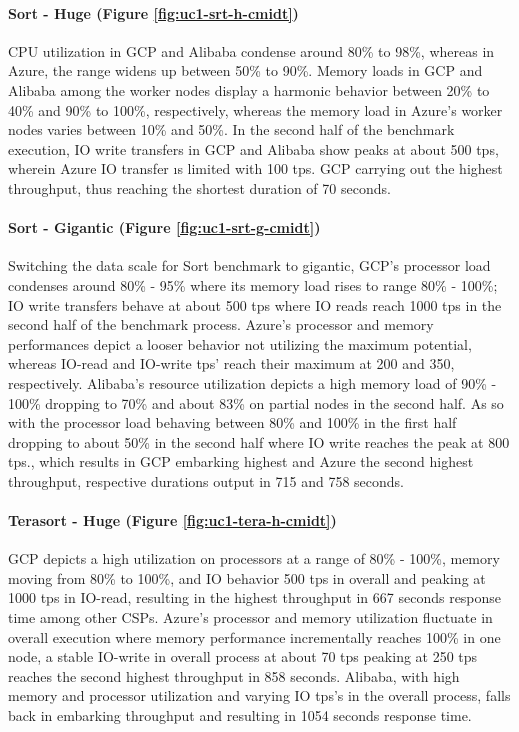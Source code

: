 \documentclass[review]{elsarticle}
\begin{document}
\paragraph{Sort - Huge (Figure \ref{fig:uc1-srt-h-cmidt})}CPU utilization in GCP and Alibaba condense around 80\% to 98\%, whereas in Azure, the range widens up between 50\% to 90\%. Memory loads in GCP and Alibaba among the worker nodes display a harmonic behavior between 20\% to 40\% and 90\% to 100\%, respectively, whereas the memory load in Azure's worker nodes varies between 10\% and 50\%. In the second half of the benchmark execution, IO write transfers in GCP and Alibaba show peaks at about 500 tps, wherein Azure IO transfer ıs limited with 100 tps. GCP carrying out the highest throughput, thus reaching the shortest duration of 70 seconds.

\paragraph{Sort - Gigantic (Figure \ref{fig:uc1-srt-g-cmidt})}Switching the data scale for Sort benchmark to gigantic, GCP's processor load condenses around 80\% - 95\% where its memory load rises to range 80\% - 100\%; IO write transfers behave at about 500 tps where IO reads reach 1000 tps in the second half of the benchmark process. Azure's processor and memory performances depict a looser behavior not utilizing the maximum potential, whereas IO-read and IO-write tps' reach their maximum at 200 and 350, respectively. Alibaba's resource utilization depicts a high memory load of 90\% - 100\% dropping to 70\% and about 83\% on partial nodes in the second half. As so with the processor load behaving between 80\% and 100\% in the first half dropping to about 50\% in the second half where IO write reaches the peak at 800 tps., which results in GCP embarking highest and Azure the second highest throughput, respective durations output in 715 and 758 seconds.

\paragraph{Terasort - Huge (Figure \ref{fig:uc1-tera-h-cmidt})}GCP depicts a high utilization on processors at a range of 80\% - 100\%, memory moving from 80\% to 100\%, and IO behavior 500 tps in overall and peaking at 1000 tps in IO-read, resulting in the highest throughput in 667 seconds response time among other CSPs. Azure's processor and memory utilization fluctuate in overall execution where memory performance incrementally reaches 100\% in one node, a stable IO-write in overall process at about 70 tps peaking at 250 tps reaches the second highest throughput in 858 seconds. Alibaba, with high memory and processor utilization and varying IO tps's in the overall process, falls back in embarking throughput and resulting in 1054 seconds response time.
\end{document}
